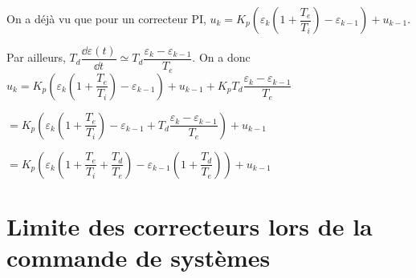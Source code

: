 \begin{demo}
On a déjà vu que pour un correcteur PI, $u_k = K_p\left(\varepsilon_k \left(1+\dfrac{T_e}{T_i}\right) - \varepsilon_{k-1}\right) + u_{k-1} $.

Par ailleurs, $T_d  \dfrac{\dd \varepsilon(t)}{\dd t} \simeq T_d  \dfrac{\varepsilon_k -\varepsilon_{k-1}}{T_e}$. 
On a donc 
 $u_k = K_p\left(\varepsilon_k \left(1+\dfrac{T_e}{T_i}\right) - \varepsilon_{k-1}\right) + u_{k-1}  + K_p  T_d  \dfrac{\varepsilon_k -\varepsilon_{k-1}}{T_e} $
 

$= K_p\left(\varepsilon_k \left(1+\dfrac{T_e}{T_i}\right) - \varepsilon_{k-1} +  T_d  \dfrac{\varepsilon_k -\varepsilon_{k-1}}{T_e}\right) + u_{k-1}   $

$= K_p\left(\varepsilon_k \left(1+\dfrac{T_e}{T_i}+\dfrac{T_d}{T_e}\right) - \varepsilon_{k-1}\left( 1+\dfrac{T_d}{T_e}\right) \right) + u_{k-1}   $

\end{demo}


\section{Limite des correcteurs lors de la commande de systèmes}

\begin{thebibliography}{2}
\end{thebibliography}






